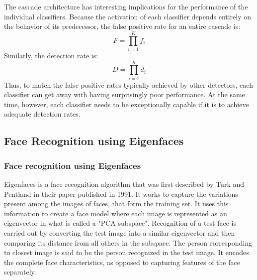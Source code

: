\documentclass[%
        final,
        notitlepage,
        narroweqnarray,
        inline,
        ]{ieee}
\begin{document}
The cascade architecture has interesting implications for the performance of the individual classifiers. Because the activation of each classifier depends entirely on the behavior of its predecessor, the false positive rate for an entire cascade is:
\begin{equation}
F = \prod _{i=1}^{K} f_i
\end{equation}
Similarly, the detection rate is:
\begin{equation}
D = \prod _{i=1}^{K} d_i
\end{equation}
Thus, to match the false positive rates typically achieved by other detectors, each classifier can get away with having surprisingly poor performance. At the same time, however, each classifier needs to be exceptionally capable if it is to achieve adequate detection rates.

\subsection{Face Recognition using Eigenfaces}

\subsubsection{Face recognition using Eigenfaces}
Eigenfaces is a face recognition algorithm that was first described by Turk and Pentland in their paper published in 1991. It works to capture the variations present among the images of faces, that form the training set. It uses this information to create a face model where each image is represented as an eigenvector in what is called a "PCA subspace". Recognition of a test face is carried out by converting the test image into a similar eigenvector and then comparing its distance from all others in the subspace. The person corresponding to closest image is said to be the person recognized in the test image. It encodes the complete face characteristics, as opposed to capturing features of the face separately.\\
\end{document}
